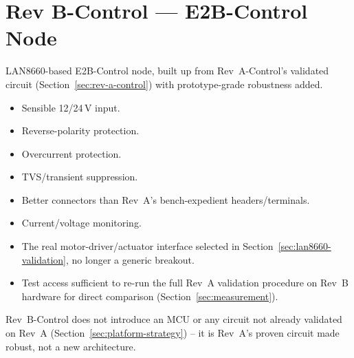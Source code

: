 \section{Rev B-Control --- E2B-Control Node}
\label{sec:rev-b-control}

LAN8660-based E2B-Control node, built up from Rev~A-Control's validated circuit (Section~\ref{sec:rev-a-control}) with prototype-grade robustness added.

\begin{itemize}[itemsep=0.1em]
\item Sensible 12/24\,V input.
\item Reverse-polarity protection.
\item Overcurrent protection.
\item TVS/transient suppression.
\item Better connectors than Rev~A's bench-expedient headers/terminals.
\item Current/voltage monitoring.
\item The real motor-driver/actuator interface selected in Section~\ref{sec:lan8660-validation}, no longer a generic breakout.
\item Test access sufficient to re-run the full Rev~A validation procedure on Rev~B hardware for direct comparison (Section~\ref{sec:measurement}).
\end{itemize}

Rev~B-Control does not introduce an MCU or any circuit not already validated on Rev~A (Section~\ref{sec:platform-strategy}) -- it is Rev~A's proven circuit made robust, not a new architecture.
